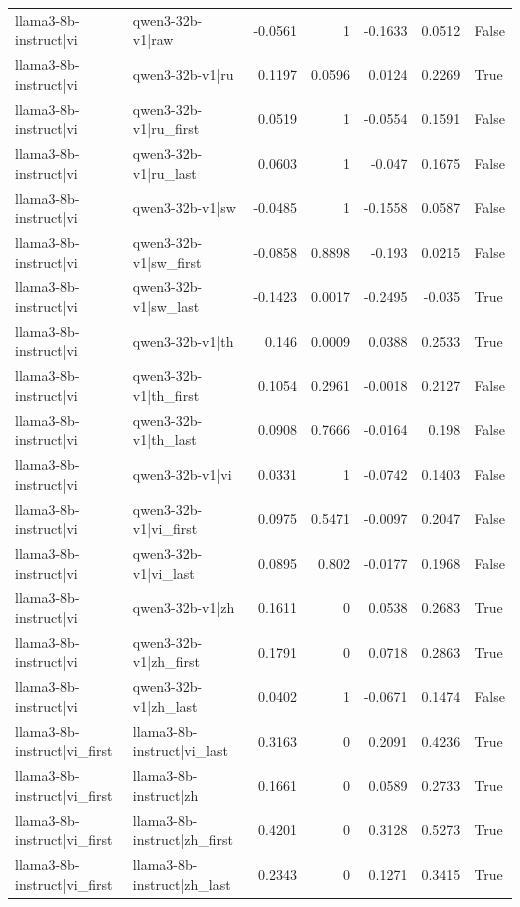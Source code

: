 \begin{table}
\begin{tabular}{l l r r r r l}
llama3-8b-instruct|vi & qwen3-32b-v1|raw & -0.0561 & 1 & -0.1633 & 0.0512 & False \\
llama3-8b-instruct|vi & qwen3-32b-v1|ru & 0.1197 & 0.0596 & 0.0124 & 0.2269 & True \\
llama3-8b-instruct|vi & qwen3-32b-v1|ru_first & 0.0519 & 1 & -0.0554 & 0.1591 & False \\
llama3-8b-instruct|vi & qwen3-32b-v1|ru_last & 0.0603 & 1 & -0.047 & 0.1675 & False \\
llama3-8b-instruct|vi & qwen3-32b-v1|sw & -0.0485 & 1 & -0.1558 & 0.0587 & False \\
llama3-8b-instruct|vi & qwen3-32b-v1|sw_first & -0.0858 & 0.8898 & -0.193 & 0.0215 & False \\
llama3-8b-instruct|vi & qwen3-32b-v1|sw_last & -0.1423 & 0.0017 & -0.2495 & -0.035 & True \\
llama3-8b-instruct|vi & qwen3-32b-v1|th & 0.146 & 0.0009 & 0.0388 & 0.2533 & True \\
llama3-8b-instruct|vi & qwen3-32b-v1|th_first & 0.1054 & 0.2961 & -0.0018 & 0.2127 & False \\
llama3-8b-instruct|vi & qwen3-32b-v1|th_last & 0.0908 & 0.7666 & -0.0164 & 0.198 & False \\
llama3-8b-instruct|vi & qwen3-32b-v1|vi & 0.0331 & 1 & -0.0742 & 0.1403 & False \\
llama3-8b-instruct|vi & qwen3-32b-v1|vi_first & 0.0975 & 0.5471 & -0.0097 & 0.2047 & False \\
llama3-8b-instruct|vi & qwen3-32b-v1|vi_last & 0.0895 & 0.802 & -0.0177 & 0.1968 & False \\
llama3-8b-instruct|vi & qwen3-32b-v1|zh & 0.1611 & 0 & 0.0538 & 0.2683 & True \\
llama3-8b-instruct|vi & qwen3-32b-v1|zh_first & 0.1791 & 0 & 0.0718 & 0.2863 & True \\
llama3-8b-instruct|vi & qwen3-32b-v1|zh_last & 0.0402 & 1 & -0.0671 & 0.1474 & False \\
llama3-8b-instruct|vi_first & llama3-8b-instruct|vi_last & 0.3163 & 0 & 0.2091 & 0.4236 & True \\
llama3-8b-instruct|vi_first & llama3-8b-instruct|zh & 0.1661 & 0 & 0.0589 & 0.2733 & True \\
llama3-8b-instruct|vi_first & llama3-8b-instruct|zh_first & 0.4201 & 0 & 0.3128 & 0.5273 & True \\
llama3-8b-instruct|vi_first & llama3-8b-instruct|zh_last & 0.2343 & 0 & 0.1271 & 0.3415 & True \\

\end{tabular}
\end{table}
